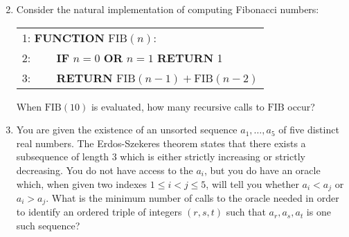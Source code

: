 \documentclass[10pt]{article}
\begin{document}
\begin{enumerate}
\begin{center}
\begin{multicols}{2}

\end{multicols}

\end{center}

\item Consider the natural implementation of computing Fibonacci numbers:

\begin{tabular}{l}
1: \textbf{FUNCTION} $\text{FIB}(n)$: \\
2:$\qquad$ \textbf{IF} $n = 0$ \textbf{OR} $n = 1$ \textbf{RETURN} 1 \\
3:$\qquad$ \textbf{RETURN} $\text{FIB}(n-1) + \text{FIB}(n-2)$
\end{tabular}

When $\text{FIB}(10)$ is evaluated, how many recursive calls to $\text{FIB}$ occur?

\item You are given the existence of an unsorted sequence $a_1,\ldots, a_5$ of five distinct real numbers.  The Erdos-Szekeres theorem states that there exists a subsequence of length $3$ which is either strictly increasing or strictly decreasing.  You do not have access to the $a_i$, but you do have an oracle which, when given two indexes $1\leq i < j\leq 5$, will tell you whether $a_i < a_j$ or $a_i > a_j$.  What is the minimum number of calls to the oracle needed in order to identify an ordered triple of integers $(r,s,t)$ such that $a_r,a_s,a_t$ is one such sequence?


\end{enumerate}
\end{document}
